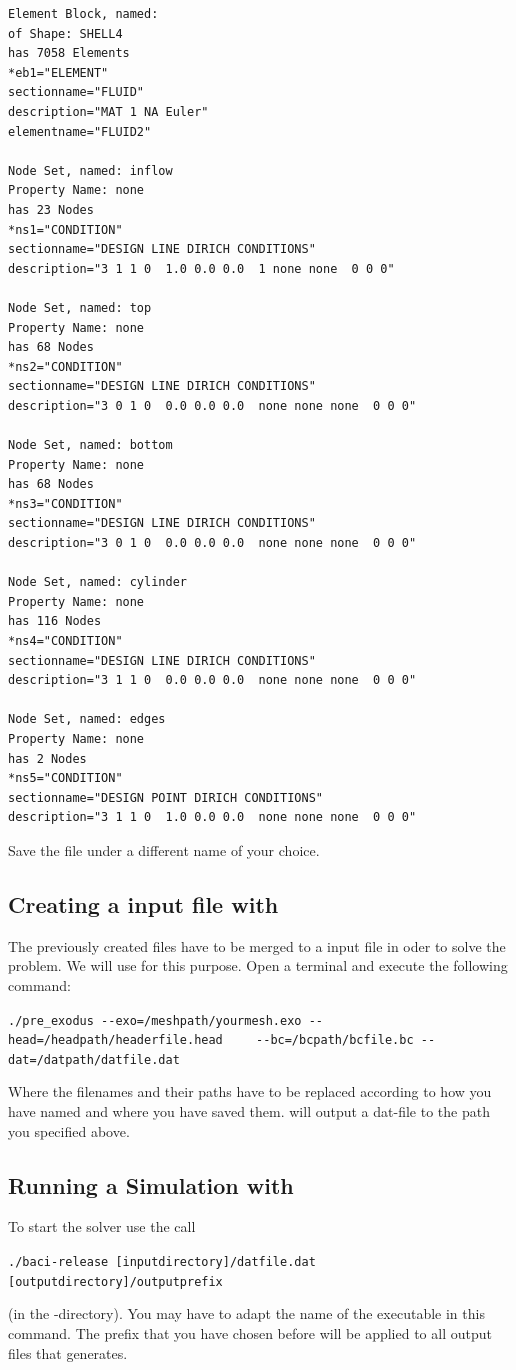  \begin{small} \begin{verbatim}
Element Block, named: 
of Shape: SHELL4
has 7058 Elements
*eb1="ELEMENT"
sectionname="FLUID"
description="MAT 1 NA Euler"
elementname="FLUID2"

Node Set, named: inflow
Property Name: none
has 23 Nodes
*ns1="CONDITION"
sectionname="DESIGN LINE DIRICH CONDITIONS"
description="3 1 1 0  1.0 0.0 0.0  1 none none  0 0 0"

Node Set, named: top
Property Name: none
has 68 Nodes
*ns2="CONDITION"
sectionname="DESIGN LINE DIRICH CONDITIONS"
description="3 0 1 0  0.0 0.0 0.0  none none none  0 0 0"

Node Set, named: bottom
Property Name: none
has 68 Nodes
*ns3="CONDITION"
sectionname="DESIGN LINE DIRICH CONDITIONS"
description="3 0 1 0  0.0 0.0 0.0  none none none  0 0 0"

Node Set, named: cylinder
Property Name: none
has 116 Nodes
*ns4="CONDITION"
sectionname="DESIGN LINE DIRICH CONDITIONS"
description="3 1 1 0  0.0 0.0 0.0  none none none  0 0 0"

Node Set, named: edges
Property Name: none
has 2 Nodes
*ns5="CONDITION"
sectionname="DESIGN POINT DIRICH CONDITIONS"
description="3 1 1 0  1.0 0.0 0.0  none none none  0 0 0"
 \end{verbatim} \end{small}
Save the file under a different name of your choice.

\subsection{Creating a \baci{} input file with \prexo}
The previously created files have to be merged to a \baci{} input file in oder 
to solve the problem. We will use \prexo for this purpose. Open a terminal 
and execute the following command:
\begin{center}
  \verb|./pre_exodus --exo=/meshpath/yourmesh.exo --head=/headpath/headerfile.head|
  \verb|	--bc=/bcpath/bcfile.bc --dat=/datpath/datfile.dat|
\end{center}
Where the filenames and their paths have to be replaced according to how you have named and where you have saved them.
\prexo will output a dat-file to the path you specified above.


\subsection{Running a Simulation with \baci{}}
\label{tut_fluid_preexo:baci}
To start the solver use the call 
\begin{center}
	\verb|./baci-release [inputdirectory]/datfile.dat [outputdirectory]/outputprefix|
\end{center}
(in the \baci{}-directory). You may have to adapt the name of the executable 
in this command. The prefix that you have chosen before will 
be applied to all output files that \baci{} generates.



